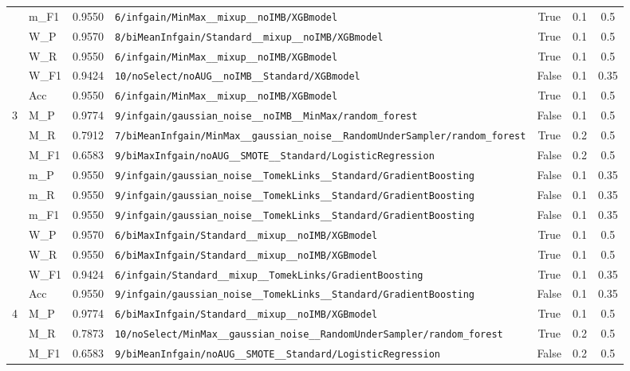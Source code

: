 \begin{table}[htbp]
\begin{tabular}{|c|l|c|>{\ttfamily\footnotesize}p{7.2cm}|c|c|c|}
 & m\_F1 & 0.9550 & \texttt{6/infgain/MinMax\_\_mixup\_\_noIMB/XGBmodel} & True & 0.1 & 0.5 \\
 & W\_P & 0.9570 & \texttt{8/biMeanInfgain/Standard\_\_mixup\_\_noIMB/XGBmodel} & True & 0.1 & 0.5 \\
 & W\_R & 0.9550 & \texttt{6/infgain/MinMax\_\_mixup\_\_noIMB/XGBmodel} & True & 0.1 & 0.5 \\
 & W\_F1 & 0.9424 & \texttt{10/noSelect/noAUG\_\_noIMB\_\_Standard/XGBmodel} & False & 0.1 & 0.35 \\
 & Acc & 0.9550 & \texttt{6/infgain/MinMax\_\_mixup\_\_noIMB/XGBmodel} & True & 0.1 & 0.5 \\
\hline
\multirow{10}{*}{3} & M\_P & 0.9774 & \texttt{9/infgain/gaussian\_noise\_\_noIMB\_\_MinMax/random\_forest} & False & 0.1 & 0.5 \\
 & M\_R & 0.7912 & \texttt{7/biMeanInfgain/MinMax\_\_gaussian\_noise\_\_RandomUnderSampler/random\_forest} & True & 0.2 & 0.5 \\
 & M\_F1 & 0.6583 & \texttt{9/biMaxInfgain/noAUG\_\_SMOTE\_\_Standard/LogisticRegression} & False & 0.2 & 0.5 \\
 & m\_P & 0.9550 & \texttt{9/infgain/gaussian\_noise\_\_TomekLinks\_\_Standard/GradientBoosting} & False & 0.1 & 0.35 \\
 & m\_R & 0.9550 & \texttt{9/infgain/gaussian\_noise\_\_TomekLinks\_\_Standard/GradientBoosting} & False & 0.1 & 0.35 \\
 & m\_F1 & 0.9550 & \texttt{9/infgain/gaussian\_noise\_\_TomekLinks\_\_Standard/GradientBoosting} & False & 0.1 & 0.35 \\
 & W\_P & 0.9570 & \texttt{6/biMaxInfgain/Standard\_\_mixup\_\_noIMB/XGBmodel} & True & 0.1 & 0.5 \\
 & W\_R & 0.9550 & \texttt{6/biMaxInfgain/Standard\_\_mixup\_\_noIMB/XGBmodel} & True & 0.1 & 0.5 \\
 & W\_F1 & 0.9424 & \texttt{6/infgain/Standard\_\_mixup\_\_TomekLinks/GradientBoosting} & True & 0.1 & 0.35 \\
 & Acc & 0.9550 & \texttt{9/infgain/gaussian\_noise\_\_TomekLinks\_\_Standard/GradientBoosting} & False & 0.1 & 0.35 \\
\hline
\multirow{10}{*}{4} & M\_P & 0.9774 & \texttt{6/biMaxInfgain/Standard\_\_mixup\_\_noIMB/XGBmodel} & True & 0.1 & 0.5 \\
 & M\_R & 0.7873 & \texttt{10/noSelect/MinMax\_\_gaussian\_noise\_\_RandomUnderSampler/random\_forest} & True & 0.2 & 0.5 \\
 & M\_F1 & 0.6583 & \texttt{9/biMeanInfgain/noAUG\_\_SMOTE\_\_Standard/LogisticRegression} & False & 0.2 & 0.5 \\

\end{tabular}
\end{table}

